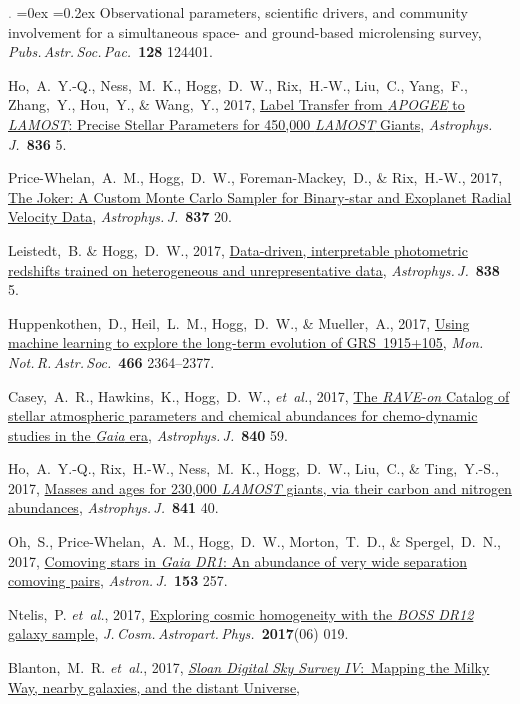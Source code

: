 \documentclass[12pt,letterpaper]{article}
\newcommand{\latin}[1]{\textsl{#1}}
\newcommand{\etal}{\latin{et~al.}}
\newcommand{\satellite}[1]{\textsl{#1}}
\newcommand{\project}[1]{\textsl{#1}}
\newcommand{\doi}[2]{\href{http://dx.doi.org/#1}{{#2}}}
\newcommand{\deemph}[1]{\textcolor{grey}{\footnotesize{#1}}}
\newcommand{\pubnumber}[1]{\deemph{{#1}.}}
\newcounter{refpubnum}
\newcommand{\hogglist}{%
    \rightmargin=0in
    \leftmargin=0.18in
    \topsep=0ex
    \partopsep=0pt
    \itemsep=0.2ex
    \parsep=0pt
    \itemindent=-1.0\leftmargin
    \listparindent=0.0\leftmargin
    \settowidth{\labelsep}{~}
    \usecounter{refpubnum}
  }
\begin{document}
\begin{list}{\pubnumber{\therefpubnum}}{\hogglist}
{Observational parameters, scientific drivers, and community involvement
for a simultaneous space- and ground-based microlensing survey},
\textit{Pubs.\,Astr.\,Soc.\,Pac.}\ \textbf{128} 124401.
\item
Ho,~A.~Y.-Q., Ness,~M.~K., Hogg,~D.~W., Rix,~H.-W., Liu,~C., Yang,~F., Zhang,~Y.,
Hou,~Y., \& Wang,~Y., 2017,
\doi{10.3847/1538-4357/836/1/5}{Label Transfer from \project{APOGEE} to \project{LAMOST}: Precise Stellar Parameters for 450,000 \project{LAMOST} Giants},
\textit{Astrophys.\,J.}\ \textbf{836} 5.
\item
Price-Whelan,~A.~M., Hogg,~D.~W., Foreman-Mackey,~D., \& Rix,~H.-W., 2017,
\doi{10.3847/1538-4357/aa5e50}{The Joker: A Custom Monte Carlo Sampler for Binary-star and Exoplanet Radial Velocity Data},
\textit{Astrophys.\,J.}\ \textbf{837} 20.
\item
Leistedt,~B. \& Hogg,~D.~W., 2017,
\doi{10.3847/1538-4357/aa6332}{Data-driven, interpretable photometric redshifts trained on heterogeneous and unrepresentative data},
\textit{Astrophys.\,J.}\ \textbf{838} 5.
\item
Huppenkothen,~D., Heil,~L.~M., Hogg,~D.~W., \& Mueller,~A., 2017,
\doi{10.1093/mnras/stw3190}{Using machine learning to explore the long-term evolution of GRS~1915+105},
\textit{Mon.\,Not.\,R.\,Astr.\,Soc.}\ \textbf{466} 2364--2377.
\item
Casey,~A.~R., Hawkins,~K., Hogg,~D.~W., \etal, 2017,
\doi{10.3847/1538-4357/aa69c2}{The \project{RAVE-on} Catalog of stellar atmospheric parameters and chemical abundances for chemo-dynamic studies in the \satellite{Gaia} era},
\textit{Astrophys.\,J.}\ \textbf{840} 59.
\item
Ho,~A.~Y.-Q., Rix,~H.-W., Ness,~M.~K., Hogg,~D.~W., Liu,~C., \& Ting,~Y.-S., 2017,
\doi{10.3847/1538-4357/aa6db3}{Masses and ages for 230,000 \project{LAMOST} giants, via their carbon and nitrogen abundances},
\textit{Astrophys.\,J.}\ \textbf{841} 40.
\item
Oh,~S., Price-Whelan,~A.~M., Hogg,~D.~W., Morton,~T.~D., \& Spergel,~D.~N., 2017,
\doi{10.3847/1538-3881/aa6ffd}{Comoving stars in \project{Gaia DR1}: An abundance of very wide separation comoving pairs},
\textit{Astron.\,J.}\ \textbf{153} 257.
\item
Ntelis,~P. \etal, 2017,
\doi{10.1088/1475-7516/2017/06/019}{Exploring cosmic homogeneity with the \project{BOSS DR12} galaxy sample},
\textit{J.\,Cosm.\,Astropart.\,Phys.}\ \textbf{2017}(06) 019.
\item
Blanton,~M.~R. \etal, 2017,
\doi{10.3847/1538-3881/aa7567}{\project{Sloan Digital Sky Survey IV}:\ Mapping the Milky Way, nearby galaxies, and the distant Universe},

\end{list}
\end{document}
